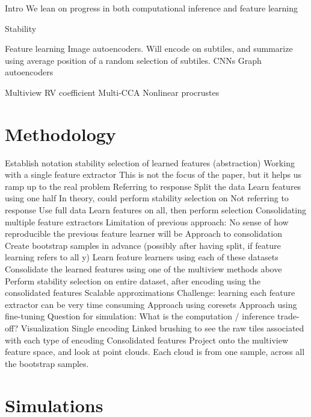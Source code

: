 \documentclass[11pt]{article}
\begin{document}
\begin{outline}
\1 Intro
  \2 We lean on progress in both computational inference and feature learning

\1 Stability

\1 Feature learning
  \2 Image autoencoders. Will encode on subtiles, and summarize using average
  position of a random selection of subtiles.
  \2 CNNs
  \2 Graph autoencoders

\1 Multiview
  \2 RV coefficient
  \2 Multi-CCA
  \2 Nonlinear procrustes
\end{outline}

\section{Methodology}

\begin{outline}
\1 Establish notation
\1 stability selection of learned features (abstraction)
  \2 Working with a single feature extractor
    \3 This is not the focus of the paper, but it helps us ramp up to the real
    problem
    \3 Referring to response
      \4 Split the data
      \4 Learn features using one half
      \4 In theory, could perform stability selection on 
    \3 Not referring to response
      \4 Use full data
      \4 Learn features on all, then perform selection
  \2 Consolidating multiple feature extractors
    \3 Limitation of previous approach: No sense of how reproducible the
    previous feature learner will be
    \3 Approach to consolidation
      \4 Create bootstrap samples in advance (possibly after having split, if feature learning refers to all y)
      \4 Learn feature learners using each of these datasets
      \4 Consolidate the learned features using one of the multiview methods above
      \4 Perform stability selection on entire dataset, after encoding using the consolidated features
\1 Scalable approximations
  \2 Challenge: learning each feature extractor can be very time consuming
  \2 Approach using coresets
  \2 Approach using fine-tuning
  \2 Question for simulation: What is the computation / inference trade-off?
\1 Visualization
  \2 Single encoding
    \3 Linked brushing to see the raw tiles associated with each type of encoding
  \2 Consolidated features
    \3 Project onto the multiview feature space, and look at point clouds. Each
    cloud is from one sample, across all the bootstrap samples.
\end{outline}

\section{Simulations}
\end{document}
